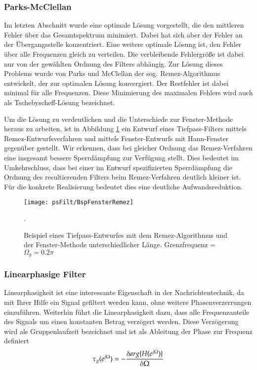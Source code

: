 \subsubsection{Parks-McClellan}
Im letzten Abschnitt wurde eine optimale Lösung vorgestellt, die den mittleren Fehler
über das Gesamtspektrum minimiert. Dabei hat sich aber der Fehler an der Übergangsstelle
konzentriert. Eine weitere optimale Lösung ist, den Fehler über alle Frequenzen gleich zu verteilen.
Die verbleibende Fehlergröße ist dabei nur von der gewählten Ordnung des Filters abhängig.
Zur Lösung dieses Problems wurde von Parks und McClellan der sog. Remez-Algorithmus entwickelt,
der zur optimalen Lösung konvergiert. Der Restfehler ist dabei minimal für alle Frequenzen.
Diese Minimierung des maximalen Fehlers wird auch als Tschebyscheff-Lösung bezeichnet.

Um die Lösung zu verdeutlichen und die Unterschiede zur Fenster-Methode heraus
zu arbeiten, ist in Abbildung \ref{pic:RemezVsFenster} ein Entwurf eines Tiefpass-Filters
mittels Remez-Entwurfsverfahren und mittels Fenster-Entwurfs mit Hann-Fenster gegenüber gestellt.
Wir erkennen, dass bei gleicher Ordnung das Remez-Verfahren eine insgesamt bessere Sperrdämpfung
zur Verfügung stellt. Dies bedeutet im Umkehrschluss, dass bei einer im Entwurf spezifizierten
Sperrdämpfung die Ordnung des resultierenden Filters beim Remez-Verfahren deutlich kleiner ist.
Für die konkrete Realisierung bedeutet dies eine deutliche Aufwandsreduktion.
\begin{figure}[H]
\begin{center}
\texttt{[image: psFilt/BspFensterRemez]}
\caption{\label{pic:RemezVsFenster}Beispiel eines Tiefpass-Entwurfes mit dem Remez-Algorithmus
und der Fenster-Methode unterschiedlicher Länge. Grenzfrequenz = $\Omega_g = 0.2\pi$}.
\end{center}
\end{figure}



\subsubsection{Linearphasige Filter}
Linearphasigkeit ist eine interessante Eigenschaft in der Nachrichtentechnik,
da mit Ihrer Hilfe ein Signal gefiltert werden kann, ohne weitere Phasenverzerrungen
einzuführen. Weiterhin führt die Linearphasigkeit dazu, dass alle Frequenzanteile des
Signals um einen konstanten Betrag verzögert werden. Diese Verzögerung wird als
Gruppenlaufzeit bezeichnet und ist als Ableitung der Phase zur Frequenz definiert
\begin{equation}\label{eq:Def:Gruppenlaufzeit}
    \tau_g (e^{j\Omega}) = - \frac{\delta arg\{H (e^{j\Omega})\}}{\delta \Omega}
\end{equation}

